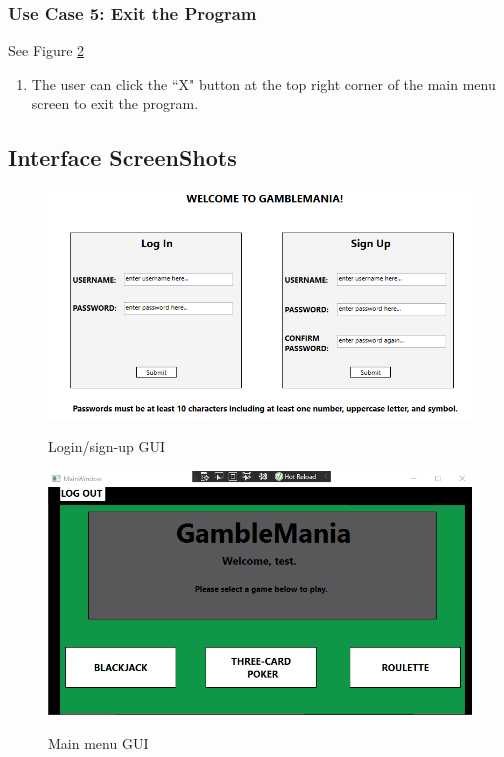 \documentclass[10pt,conference,onecolumn,compsoc]{IEEEtran}
\begin{document}
\subsubsection{Use Case 5: Exit the Program}
See Figure \ref{fig:main}
\begin{enumerate}
\item The user can click the ``X" button at the top right corner of the main menu screen to exit the program.
\end{enumerate}

\newpage
\subsection{Interface ScreenShots}

\begin{figure}[h]
\caption{Login/sign-up GUI}
\includegraphics[scale=0.4]{Sign_up}
\label{fig:Login}
\centering
\end{figure}

\begin{figure}[h]
\caption{Main menu GUI}
\includegraphics[scale=0.4]{Main_Menu}
\label{fig:main}
\centering
\end{figure}
\end{document}
